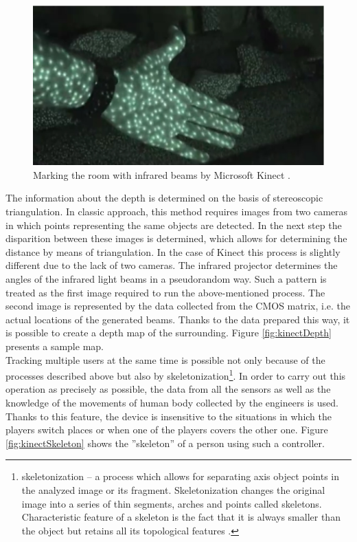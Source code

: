 \documentclass{jacsart}
\begin{document}
\begin{figure}[!t]
\includegraphics[width=0.9\linewidth]{./kinectIRLighting}
\caption{Marking the room with infrared beams by Microsoft Kinect \cite{Jr2011}.}
\label{fig:kinectDots}
\end{figure} 

\indent The information about the depth is determined on the basis of stereoscopic triangulation. In classic approach, this method requires images from two cameras in which points representing the same objects are detected.  In the next step the disparition between these images is determined, which allows for determining the distance by means of triangulation. In the case of Kinect this process is slightly different due to the lack of two cameras. The infrared projector determines the angles of the infrared light beams in a pseudorandom way. Such a pattern is treated as the first image required to run the above-mentioned process.  The second image is represented by the data collected from the CMOS matrix, i.e. the actual locations of the generated beams. Thanks to the data prepared this way, it is possible to create a depth map of the surrounding. Figure \ref{fig:kinectDepth} presents a sample map.\\
\indent Tracking multiple users at the same time is possible not only because of the processes described above but also by skeletonization\footnote{skeletonization – a process which allows for separating axis object points in the analyzed image or its fragment. Skeletonization changes the original image into a series of thin segments, arches and points called skeletons. Characteristic feature of a skeleton is the fact that it is always smaller than the object but retains all its topological features \cite{Radzienski2007}.}. In order to carry out this operation as precisely as possible, the data from all the sensors as well as the knowledge of the movements of human body collected by the engineers is used.\\
\indent Thanks to this feature, the device is insensitive to the situations in which the players switch places or when one of the players covers the other one. Figure \ref{fig:kinectSkeleton} shows the ''skeleton'' of a person using such a controller.\\
\end{document}
